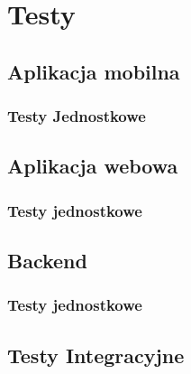 \chapter{Testy}

\section{Aplikacja mobilna}
\subsection{Testy Jednostkowe}

\section{Aplikacja webowa}
\subsection{Testy jednostkowe}

\section{Backend}
\subsection{Testy jednostkowe}

\section{Testy Integracyjne}